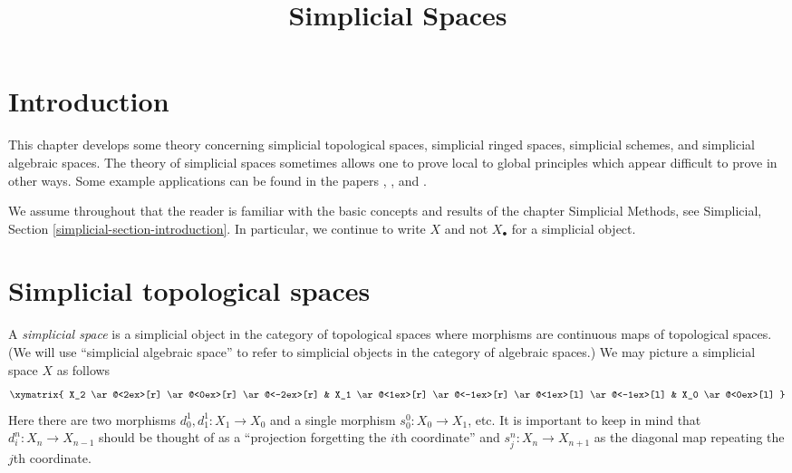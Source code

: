 

%


\title{Simplicial Spaces}


\maketitle

\label{section-phantom}

\tableofcontents

\section{Introduction}
\label{section-introduction}

\noindent
This chapter develops some theory concerning simplicial topological spaces,
simplicial ringed spaces, simplicial schemes, and simplicial algebraic spaces.
The theory of simplicial spaces sometimes allows one to prove local to global
principles which appear difficult to prove in other ways.
Some example applications can be found in the papers
\cite{faltings_finiteness}, \cite{Kiehl}, and \cite{HodgeIII}.

\medskip\noindent
We assume throughout that the reader is familiar with the basic concepts
and results of the chapter Simplicial Methods, see
Simplicial, Section \ref{simplicial-section-introduction}.
In particular, we continue to write $X$ and not $X_\bullet$
for a simplicial object.








\section{Simplicial topological spaces}
\label{section-simplicial-top}

\noindent
A {\it simplicial space} is a simplicial object in the category of
topological spaces where morphisms are continuous maps of topological
spaces. (We will use ``simplicial algebraic space'' to refer to simplicial
objects in the category of algebraic spaces.)
We may picture a simplicial space $X$ as follows
$$
\xymatrix{
X_2
\ar@<2ex>[r]
\ar@<0ex>[r]
\ar@<-2ex>[r]
&
X_1
\ar@<1ex>[r]
\ar@<-1ex>[r]
\ar@<1ex>[l]
\ar@<-1ex>[l]
&
X_0
\ar@<0ex>[l]
}
$$
Here there are two morphisms $d^1_0, d^1_1 : X_1 \to X_0$
and a single morphism $s^0_0 : X_0 \to X_1$, etc.
It is important to keep in mind that $d^n_i : X_n \to X_{n - 1}$
should be thought of as a ``projection forgetting the
$i$th coordinate'' and $s^n_j : X_n \to X_{n + 1}$ as the diagonal
map repeating the $j$th coordinate.


